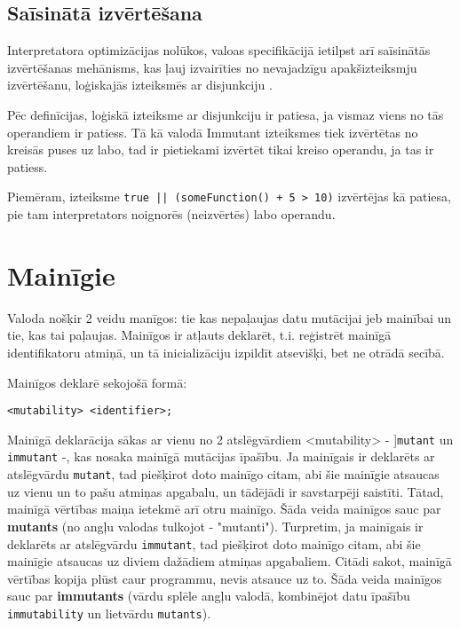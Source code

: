 \documentclass[12pt,a4paper]{report}
\begin{document}
\subsection{Saīsinātā izvērtēšana}

Interpretatora optimizācijas nolūkos, valoas specifikācijā ietilpst arī saīsinātās izvērtēšanas mehānisms, kas ļauj izvairīties no nevajadzīgu apakšizteiksmju izvērtēšanu, loģiskajās izteiksmēs ar disjunkciju \cite{short-circuit-logic}.

Pēc definīcijas, loģiskā izteiksme ar disjunkciju ir patiesa, ja vismaz viens no tās operandiem ir patiess.
Tā kā valodā Immutant izteiksmes tiek izvērtētas no kreisās puses uz labo, tad ir pietiekami izvērtēt tikai kreiso operandu, ja tas ir patiess.

Piemēram, izteiksme \texttt{true || (someFunction() + 5 > 10)} izvērtējas kā patiesa, pie tam interpretators noignorēs (neizvērtēs) labo operandu.

\section{Mainīgie}
\label{section:vars}

Valoda nošķir 2 veidu manīgos: tie kas nepaļaujas datu mutācijai jeb mainībai un tie, kas tai paļaujas. Mainīgos ir atļauts deklarēt, t.i. reģistrēt mainīgā identifikatoru atmiņā, un tā inicializāciju izpildīt atsevišķi, bet ne otrādā secībā.

Mainīgos deklarē sekojošā formā:
\begin{verbatim}
<mutability> <identifier>;
\end{verbatim}

Mainīgā deklarācija sākas ar vienu no 2 atslēgvārdiem <mutability> - ]\texttt{mutant} un \texttt{immutant} -, kas nosaka mainīgā mutācijas īpašību. Ja mainīgais ir deklarēts ar atslēgvārdu \texttt{mutant}, tad piešķirot doto mainīgo citam, abi šie mainīgie atsaucas uz vienu un to pašu atmiņas apgabalu, un tādējādi ir savstarpēji saistīti. Tātad, mainīgā vērtības maiņa ietekmē arī otru mainīgo. Šāda veida mainīgos sauc par \textbf{mutants} (no angļu valodas tulkojot - "mutanti").
Turpretim, ja mainīgais ir deklarēts ar atslēgvārdu \texttt{immutant}, tad piešķirot doto mainīgo citam, abi šie mainīgie atsaucas uz diviem dažādiem atmiņas apgabaliem. Citādi sakot, mainīgā vērtības kopija plūst caur programmu, nevis atsauce uz to. Šāda veida mainīgos sauc par \textbf{immutants} (vārdu splēle angļu valodā, kombinējot datu īpašību \texttt{immutability} un lietvārdu \texttt{mutants}).
\end{document}
